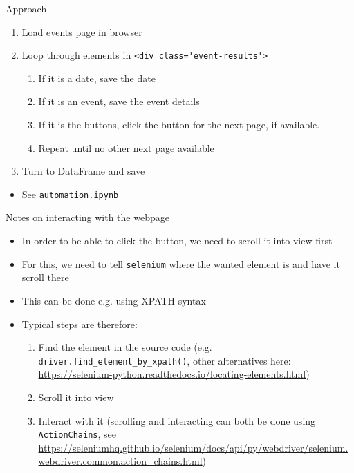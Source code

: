 \begin{frame}[fragile]{Approach}
\begin{enumerate}
	\item Load events page in browser
	\item Loop through elements in \verb!<div class='event-results'>!
	\begin{enumerate}
		\item If it is a date, save the date
		\item If it is an event, save the event details
		\item If it is the buttons, click the button for the next page, if available.
	    \item Repeat until no other next page available
	\end{enumerate}
	\item Turn to DataFrame and save
\end{enumerate}
\begin{itemize}
	\item See \verb!automation.ipynb!
\end{itemize}
\end{frame}

\begin{frame}{Notes on interacting with the webpage}
\begin{itemize}
	\item In order to be able to click the button, we need to scroll it into view first
	\item For this, we need to tell \verb!selenium! where the wanted element is and have it scroll there
	\item This can be done e.g. using XPATH syntax
	\item Typical steps are therefore:
	\begin{enumerate}
		\item Find the element in the source code (e.g. \verb!driver.find_element_by_xpath()!, other alternatives here: \url{https://selenium-python.readthedocs.io/locating-elements.html})
		\item Scroll it into view 
		\item Interact with it (scrolling and interacting can both be done using \verb!ActionChains!, see \url{https://seleniumhq.github.io/selenium/docs/api/py/webdriver/selenium.webdriver.common.action_chains.html})
	\end{enumerate}
\end{itemize}

\end{frame}